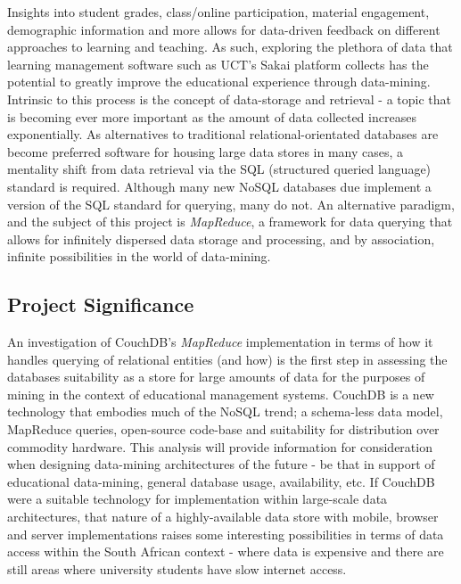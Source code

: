 Insights into student grades, class/online participation, material engagement, demographic information and more allows for data-driven feedback on different approaches to learning and teaching. As such, exploring the plethora of data that learning management software such as UCT's Sakai platform collects has the potential to greatly improve the educational experience through data-mining. Intrinsic to this process is the concept of data-storage and retrieval - a topic that is becoming ever more important as the amount of data collected increases exponentially. As alternatives to traditional relational-orientated databases are become preferred software for housing large data stores in many cases, a mentality shift from data retrieval via the SQL (structured queried language) standard is required. Although many new NoSQL databases due implement a version of the SQL standard for querying, many do not. An alternative paradigm, and the subject of this project is \textit{MapReduce}, a framework for data querying that allows for infinitely dispersed data storage and processing, and by association, infinite possibilities in the world of data-mining.

\subsection{Project Significance}
An investigation of CouchDB's \textit{MapReduce} implementation in terms of how it handles querying of relational entities (and how) is the first step in assessing the databases suitability as a store for large amounts of data for the purposes of mining in the context of educational management systems. CouchDB is a new technology that embodies much of the NoSQL trend; a schema-less data model, MapReduce queries, open-source code-base and suitability for distribution over commodity hardware. This analysis will provide information for consideration when designing data-mining architectures of the future - be that in support of educational data-mining, general database usage, availability, etc. If CouchDB were a suitable technology for implementation within large-scale data architectures, that nature of a highly-available data store with mobile, browser and server implementations raises some interesting possibilities in terms of data access within the South African context - where data is expensive and there are still areas where university students have slow internet access.